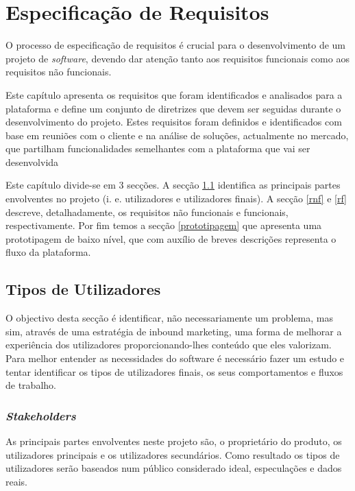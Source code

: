 \chapter{Especificação de Requisitos}
\label{sec:requisitos}

O processo de especificação de requisitos é crucial para o desenvolvimento de um projeto de \textit{software}, devendo dar atenção tanto aos requisitos funcionais como aos requisitos não funcionais.

Este capítulo apresenta os requisitos que foram identificados e analisados para a plataforma e define um conjunto de diretrizes que devem ser seguidas durante o desenvolvimento do projeto. Estes requisitos foram definidos e identificados com base em reuniões com o cliente e na análise de soluções, actualmente no mercado, que partilham funcionalidades semelhantes com a plataforma que vai ser desenvolvida

Este capítulo divide-se em 3 secções. A secção \ref{requisitos:tiposutilizadores} identifica as principais partes envolventes no projeto (i. e. utilizadores e utilizadores finais). A secção \ref{rnf} e \ref{rf} descreve, detalhadamente, os requisitos não funcionais e funcionais, respectivamente. Por fim temos a secção \ref{prototipagem} que apresenta uma prototipagem de baixo nível, que com auxílio de breves descrições representa o fluxo da plataforma.


\section{Tipos de Utilizadores}
\label{requisitos:tiposutilizadores}

O objectivo desta secção é identificar, não necessariamente um problema, mas sim, através de uma estratégia de inbound marketing, uma forma de melhorar a experiência dos utilizadores proporcionando-lhes conteúdo que eles valorizam. Para melhor entender as necessidades do software é necessário fazer um estudo e tentar identificar os tipos de utilizadores finais, os seus comportamentos e fluxos de trabalho.


\subsection{\textit{Stakeholders}}

As principais partes envolventes neste projeto são, o proprietário do produto, os utilizadores principais e os utilizadores secundários. Como resultado os tipos de utilizadores serão baseados num público considerado  ideal, especulações e dados reais.



